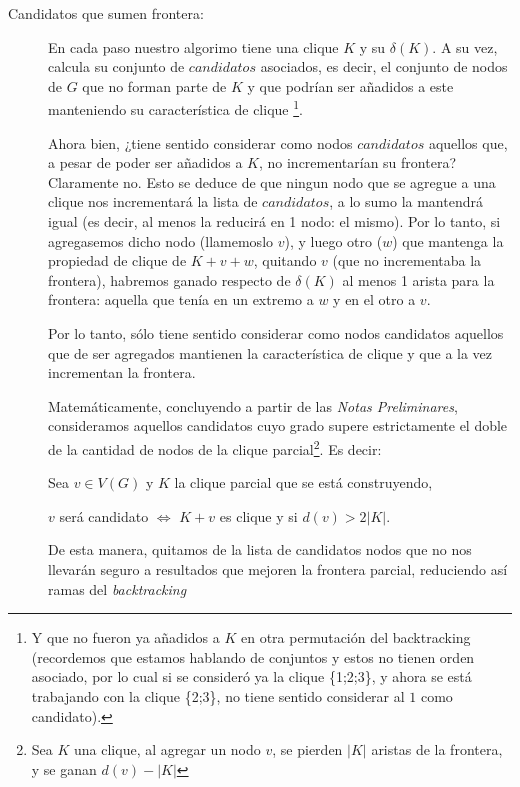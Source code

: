 \begin{description}
    \item[Candidatos que sumen frontera: ] En cada paso nuestro algorimo tiene
        una clique $K$ y su $\delta(K)$. A su vez, calcula su conjunto de $candidatos$
        asociados, es decir, el conjunto de nodos de $G$ que no forman parte de $K$ y
        que podr\'ian ser a\~nadidos a este manteniendo su caracter\'istica de clique%
        \footnote{Y que no fueron ya a\~nadidos a $K$ en otra permutaci\'on del backtracking
        (recordemos que estamos hablando de conjuntos y estos no tienen orden asociado, por
        lo cual si se consider\'o ya la clique \{1;2;3\}, y ahora se est\'a trabajando con
        la clique \{2;3\}, no tiene sentido considerar al $1$ como candidato).}.

        \par Ahora bien, ¿tiene sentido considerar como nodos $candidatos$ aquellos que,
            a pesar de poder ser a\~nadidos a $K$, no incrementar\'ian su frontera? Claramente
            no. Esto se deduce de que ningun nodo que se agregue a una clique nos incrementar\'a
            la lista de $candidatos$, a lo sumo la mantendr\'a igual (es decir, al menos la reducir\'a
            en 1 nodo: el mismo). Por lo tanto, si agregasemos dicho nodo (llamemoslo $v$), y
            luego otro ($w$) que mantenga la propiedad de clique de $K+v+w$,
            quitando $v$ (que no incrementaba la frontera), habremos ganado respecto de $\delta(K)$
            al menos 1 arista para la frontera: aquella que ten\'ia en un extremo a $w$ y en
            el otro a $v$.

        \par Por lo tanto, s\'olo tiene sentido considerar como nodos candidatos aquellos que
            de ser agregados mantienen la caracter\'istica de clique y que a la vez incrementan
            la frontera.

        \par Matem\'aticamente, concluyendo a partir de las \emph{Notas Preliminares}, consideramos
            aquellos candidatos cuyo grado supere estrictamente el doble de la cantidad
            de nodos de la clique parcial\footnote{Sea $K$ una clique, al agregar un nodo $v$, se pierden
            $|K|$ aristas de la frontera, y se ganan $d(v) - |K|$}. Es decir:

        \bigskip
        \par Sea $v \in V(G)$ y $K$ la clique parcial que se est\'a construyendo,
        \par $v$ ser\'a candidato $\iff$ $K+v$ es clique y si $d(v) > 2|K|$.

        \bigskip
        \par De esta manera, quitamos de la lista de candidatos nodos que no nos
            llevar\'an seguro a resultados que mejoren la frontera parcial, reduciendo
            as\'i ramas del \emph{backtracking}

\end{description}

